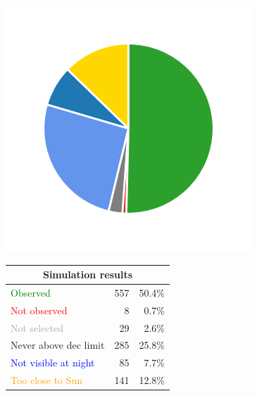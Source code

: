 \begin{colsection}
\begin{figure}[p]
    \begin{center}
        \begin{minipage}[t]{0.15\linewidth}\vspace{0.6cm}
            \includegraphics[trim={.5cm 0 .5cm 0},clip,width=\linewidth]{images/gw_sims/2n8_pie.png}
        \end{minipage}
        \begin{minipage}[t]{0.45\linewidth}\vspace{0pt}
            \begin{tabular}{lrr}
                \multicolumn{3}{c}{\textbf{Simulation results}} \\
                \midrule
                \textcolor{Green}{Observed} & 557 & 50.4\% \\
                \textcolor{Red}{Not observed} & 8 & 0.7\% \\
                \textcolor{darkgray}{Not selected} & 29 & 2.6\% \\
                \textcolor{NavyBlue}{Never above dec limit} & 285 & 25.8\% \\
                \textcolor{Blue}{Not visible at night} & 85 & 7.7\% \\
                \textcolor{Orange}{Too close to Sun} & 141 & 12.8\% \\

\end{tabular}
\end{minipage}
\end{center}
\end{figure}
\end{colsection}
